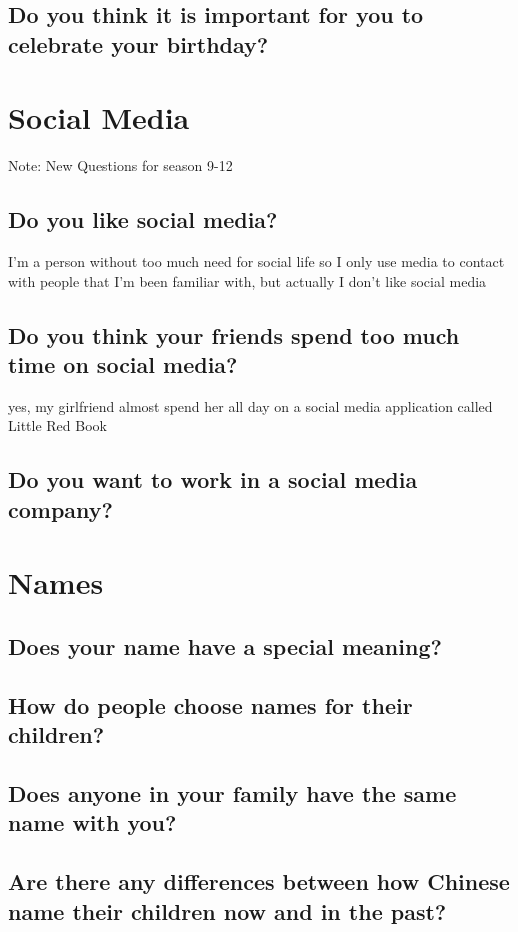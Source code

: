 \documentclass[conference]{IEEEtran}
\begin{document}
\subsection{Do you think it is important for you to celebrate your birthday?}

\section{Social Media}
Note: New Questions for season 9-12
\subsection{Do you like social media?}
I'm a person without too much need for social life
so I only use media to contact with people that I'm been
familiar with, but actually I don't like social media
\subsection{Do you think your friends spend too much time on social media?}
yes, my girlfriend almost spend her all day on a social media application
called Little Red Book
\subsection{Do you want to work in a social media company?}

\section{Names}
\subsection{Does your name have a special meaning?}
\subsection{How do people choose names for their children?}
\subsection{Does anyone in your family have the same name with you?}
\subsection{Are there any differences between how Chinese name their
children now and in the past?}
\end{document}
